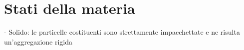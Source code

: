\section{Stati della materia}
- Solido: le particelle costituenti sono strettamente impacchettate e ne risulta un'aggregazione rigida
